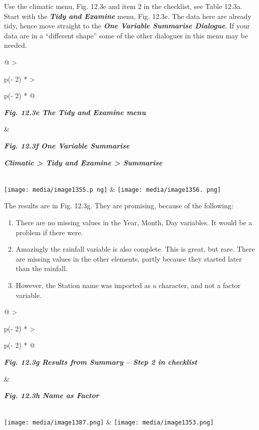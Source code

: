 \documentclass[
  letterpaper,
  DIV=11,
  numbers=noendperiod]{scrreprt}
\begin{document}
Use the climatic menu, Fig. 12.3e and item 2 in the checklist, see Table
12.3a. Start with the \textbf{\emph{Tidy and Examine}} menu, Fig. 12.3e.
The data here are already tidy, hence move straight to the
\textbf{\emph{One Variable Summarise Dialogue}}. If your data are in a
``different shape'' some of the other dialogues in this menu may be
needed.

\begin{longtable}[]{@{}
  >{\raggedright\arraybackslash}p{(\columnwidth - 2\tabcolsep) * }
  >{\raggedright\arraybackslash}p{(\columnwidth - 2\tabcolsep) * }@{}}
\toprule\noalign{}
\begin{minipage}[b]{\linewidth}\raggedright
\textbf{\emph{Fig. 12.3e The Tidy and Examine menu}}
\end{minipage} & \begin{minipage}[b]{\linewidth}\raggedright
\textbf{\emph{Fig. 12.3f One Variable Summarise}}

\textbf{\emph{Climatic \textgreater{} Tidy and Examine \textgreater{}
Summarise}}
\end{minipage} \\
\midrule\noalign{}
\endhead
\bottomrule\noalign{}
\endlastfoot
\texttt{[image: media/image1355.p ng]}
&
\texttt{[image: media/image1356. png]} \\
\end{longtable}

The results are in Fig. 12.3g. They are promising, because of the
following:

\begin{enumerate}
\def\labelenumi{\alph{enumi})}
\item
  There are no missing values in the Year, Month, Day variables. It
  would be a problem if there were.
\item
  Amazingly the rainfall variable is also complete. This is great, but
  rare. There are missing values in the other elements, partly because
  they started later than the rainfall.
\item
  However, the Station name was imported as a character, and not a
  factor variable.
\end{enumerate}

\begin{longtable}[]{@{}
  >{\raggedright\arraybackslash}p{(\columnwidth - 2\tabcolsep) * }
  >{\raggedright\arraybackslash}p{(\columnwidth - 2\tabcolsep) * }@{}}
\toprule\noalign{}
\begin{minipage}[b]{\linewidth}\raggedright
\textbf{\emph{Fig. 12.3g Results from Summary -- Step 2 in checklist}}
\end{minipage} & \begin{minipage}[b]{\linewidth}\raggedright
\textbf{\emph{Fig. 12.3h Name as Factor}}
\end{minipage} \\
\midrule\noalign{}
\endhead
\bottomrule\noalign{}
\endlastfoot
\texttt{[image: media/image1387.png]}
&
\texttt{[image: media/image1353.png]} \\
\end{longtable}
\end{document}
